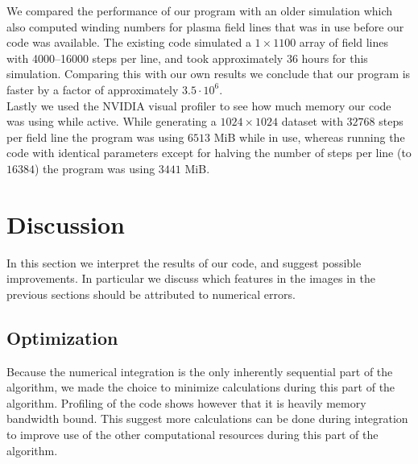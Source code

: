 \documentclass{article}
\begin{document}
\FloatBarrier

We compared the performance of our program with an older simulation which also computed winding numbers for plasma field lines that was in use before our code was available. 
The existing code simulated a $1\times 1100$ array of field lines with 4000--16000 steps per line, and took approximately $36$ hours for this simulation. 
Comparing this with our own results we conclude that our program is faster by a factor of approximately $3.5\cdot 10^6$.\\

Lastly we used the NVIDIA visual profiler to see how much memory our code was using while active. 
While generating a $1024\times 1024$ dataset with $32768$ steps per field line the program was using $6513$ MiB while in use, whereas running the code with identical parameters except for halving the number of steps per line (to $16384$) the program was using $3441$ MiB.


\section{Discussion}
In this section we interpret the results of our code, and suggest possible improvements. In particular we discuss which features in the images in the previous sections should be attributed to numerical errors.

\subsection{Optimization}
Because the numerical integration is the only inherently sequential part of the algorithm, we made the choice to minimize calculations during this part of the algorithm. 
Profiling of the code shows however that it is heavily memory bandwidth bound. 
This suggest more calculations can be done during integration to improve use of the other computational resources during this part of the algorithm.\\
\end{document}
